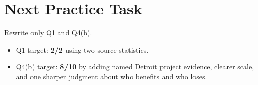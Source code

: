 \documentclass[11pt,a4paper]{article}
\newcommand{\score}[1]{\textcolor{AccentTeal}{\textbf{#1}}}
\begin{document}
\section{Next Practice Task}

Rewrite only Q1 and Q4(b).

\begin{itemize}
  \item Q1 target: \score{2/2} using two source statistics.
  \item Q4(b) target: \score{8/10} by adding named Detroit project evidence,
  clearer scale, and one sharper judgment about who benefits and who loses.
\end{itemize}
\end{document}
